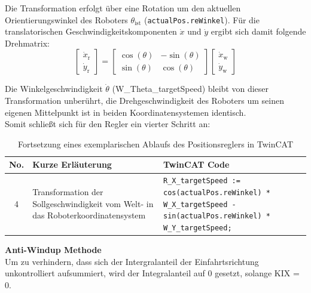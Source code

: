 Die Transformation erfolgt über eine Rotation um den aktuellen Orientierungswinkel des Roboters $\theta_{\text{ist}}$ (\texttt{actualPos.reWinkel}). Für die translatorischen Geschwindigkeitskomponenten $\dot{x}$ und $\dot{y}$ ergibt sich damit folgende Drehmatrix:
\begin{equation}
    \begin{bmatrix}
        \dot{x}_{\text{r}} \\
        \dot{y}_{\text{r}}
    \end{bmatrix}
    =
    \begin{bmatrix}
        \cos(\theta) & -\sin(\theta) \\
        \sin(\theta) & \cos(\theta)
    \end{bmatrix}
    \begin{bmatrix}
        \dot{x}_{\text{w}} \\
        \dot{y}_{\text{w}}
    \end{bmatrix}
\end{equation}


Die Winkelgeschwindigkeit $\dot{\theta}$ (W\_Theta\_targetSpeed) bleibt von dieser Transformation unberührt, die Drehgeschwindigkeit des Roboters um seinen eigenen Mittelpunkt ist in beiden Koordinatensystemen identisch.\\
Somit schließt sich für den Regler ein vierter Schritt an:

\begin{table}[H]
    \centering
    \label{tab:Positionsregler_Transformation}
    \caption{Fortsetzung eines exemplarischen Ablaufs des Positionsreglers in TwinCAT}
    \begin{tabular}{|c|p{6cm}|p{7cm}|}
        \hline
        \textbf{No.} & \textbf{Kurze Erläuterung} & \textbf{TwinCAT Code} \\
        \hline
        4 & Transformation der Sollgeschwindigkeit vom Welt- in das Roboterkoordinatensystem & 
        \texttt{R\_X\_targetSpeed := cos(actualPos.reWinkel) * W\_X\_targetSpeed - sin(actualPos.reWinkel) * W\_Y\_targetSpeed;}\\      
        \hline
    \end{tabular}
    
\end{table}
\noindent \textbf{Anti-Windup Methode}\\
Um zu verhindern, dass sich der Intergralanteil der Einfahrtsrichtung unkontrolliert aufsummiert, wird der Integralanteil auf 0 gesetzt, solange KIX = 0.

